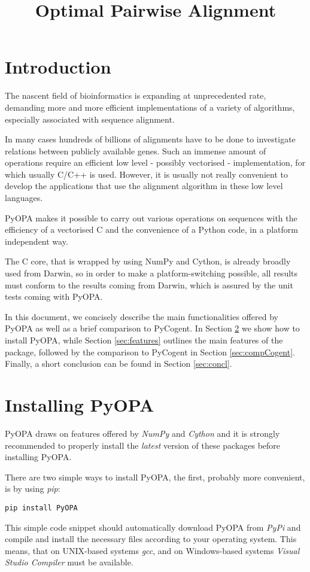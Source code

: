 \documentclass[12pt]{article}
\title{Optimal Pairwise Alignment}
\author{}
\newcommand{\pp}{PyOPA}
\begin{document}
\maketitle
\newpage
\tableofcontents
\newpage
\section{Introduction}
The nascent field of bioinformatics is expanding at unprecedented rate, demanding more and more efficient implementations of a variety of algorithms, especially associated with sequence alignment.

In many cases hundreds of billions of alignments have to be done to investigate relations between publicly available genes. Such an immense amount of operations require an efficient low level - possibly vectorised - implementation, for which usually C/C++ is used. However, it is usually not really convenient to develop the applications that use the alignment algorithm in these low level languages.

\pp{} makes it possible to carry out various operations on sequences with the efficiency of a vectorised C and the convenience of a Python code, in a platform independent way. 

The C core, that is wrapped by using NumPy and Cython, is already broadly used from Darwin, so in order to make a platform-switching possible, all results must conform to the results coming from Darwin, which is assured by the unit tests coming with \pp{}.

In this document, we concisely describe the main functionalities offered by \pp{} as well as a brief comparison to PyCogent. In Section \ref{sec:inst} we show how to install \pp{}, while Section \ref{sec:features} outlines the main features of the package, followed by the comparison to PyCogent in Section \ref{sec:compCogent}. Finally, a short conclusion can be found in Section \ref{sec:concl}. 

\section{Installing \pp{}}
\label{sec:inst}
\pp{} draws on features offered by \emph{NumPy} and \emph{Cython} and it is strongly recommended to properly install the \emph{latest} version of these packages before installing \pp{}.

There are two simple ways to install \pp{}, the first, probably more convenient, is by using \emph{pip}:
\begin{lstlisting}
pip install PyOPA
\end{lstlisting}
This simple code snippet should automatically download \pp{} from \emph{PyPi} and compile and install the necessary files according to your operating system. This means, that on UNIX-based systems \emph{gcc}, and on Windows-based systems \emph{Visual Studio Compiler} must be available.
\end{document}
